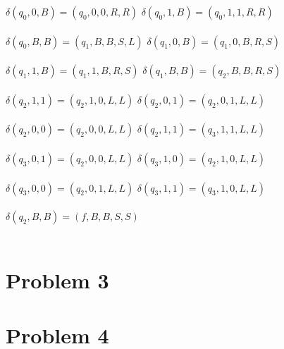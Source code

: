 \documentclass{article}%
\begin{document}
$\delta(q_0, 0, B) = (q_0, 0, 0, R, R)$
\hfill
$\delta(q_0, 1, B) = (q_0, 1, 1, R, R)$\\
\\
$\delta(q_0, B, B) = (q_1, B, B, S, L)$
\hfill
$\delta(q_1, 0, B) = (q_1, 0, B, R, S)$\\
\\
$\delta(q_1, 1, B) = (q_1, 1, B, R, S)$
\hfill
$\delta(q_1, B, B) = (q_2, B, B, R, S)$\\
\\
$\delta(q_2, 1, 1) = (q_2, 1, 0, L, L)$
\hfill
$\delta(q_2, 0, 1) = (q_2, 0, 1, L, L)$\\
\\
$\delta(q_2, 0, 0) = (q_2, 0, 0, L, L)$
\hfill
$\delta(q_2, 1, 1) = (q_3, 1, 1, L, L)$\\
\\
$\delta(q_3, 0, 1) = (q_2, 0, 0, L, L)$
\hfill
$\delta(q_3, 1, 0) = (q_2, 1, 0, L, L)$\\
\\
$\delta(q_3, 0, 0) = (q_2, 0, 1, L, L)$
\hfill
$\delta(q_3, 1, 1) = (q_3, 1, 0, L, L)$\\
\\
$\delta(q_2, B, B) = (f, B, B, S, S)$\\
\\

\section*{Problem 3}

\section*{Problem 4}
\end{document}
